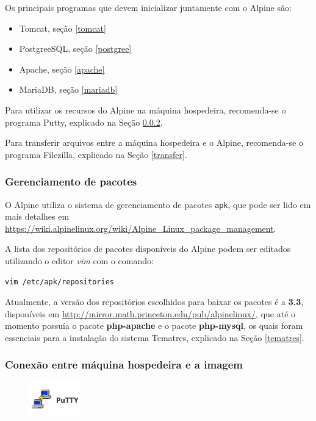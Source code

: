 Os principais programas que devem inicializar juntamente com o Alpine são:

\begin{itemize}
    \item Tomcat, seção \ref{tomcat}
    \item PostgreeSQL, seção \ref{postgree}
    \item Apache, seção \ref{apache}
    \item MariaDB, seção \ref{mariadb}
\end{itemize}

Para utilizar os recursos do Alpine na máquina hospedeira, recomenda-se o programa Putty, explicado na Seção \ref{conexao}.

Para transferir arquivos entre a máquina hospedeira e o Alpine, recomenda-se o programa Filezilla, explicado na Seção \ref{transfer}.

\subsubsection{Gerenciamento de pacotes}

O Alpine utiliza o sistema de gerenciamento de pacotes \lstinline{apk}, que pode ser lido em mais detalhes em \url{https://wiki.alpinelinux.org/wiki/Alpine_Linux_package_management}.

A lista dos repositórios de pacotes disponíveis do Alpine podem ser editados utilizando o editor \textit{vim} com o comando:

\begin{lstlisting}[language=bash]
    vim /etc/apk/repositories
\end{lstlisting}

Atualmente, a versão dos repositórios escolhidos para baixar os pacotes é a \textbf{3.3}, disponíveis em \url{http://mirror.math.princeton.edu/pub/alpinelinux/}, que até o momento possuía o pacote \textbf{php-apache} e o pacote \textbf{php-mysql}, os quais foram essenciais para a instalação do sistema Tematres, explicado na Seção \ref{tematres}.

\subsubsection{Conexão entre máquina hospedeira e a imagem}\label{conexao}

\begin{figure} %
    \centering
    \includegraphics[width=0.2\textwidth]{../images/putty1.png}
\end{figure}

